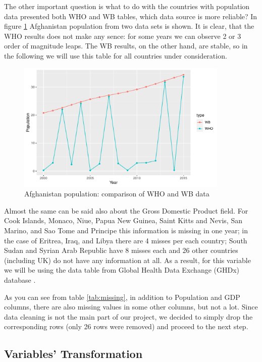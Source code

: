 The other important question is what to do with the countries with population data presented both WHO and WB tables, which data source is more reliable? In figure \ref{fig:afghanistan_pop_comparison} Afghanistan population from two data sets is shown. It is clear, that the WHO results does not make any sence: for some years we can observe 2 or 3 order of magnitude leaps. The WB results, on the other hand, are stable, so in the following we will use this table for all countries under consideration.


\begin{figure}
  \centering
  \includegraphics[width = 0.9\textwidth]{figures/Afghanistan_population_comparison}
  \caption{Afghanistan population: comparison of WHO and WB data}
  \label{fig:afghanistan_pop_comparison}
\end{figure}

Almost the same can be said also about the Gross Domestic Product field. For Cook Islands, Monaco, Niue, Papua New Guinea, Saint Kitts and Nevis, San Marino, and Sao Tome and Principe this information is missing in one year; in the case of Eritrea, Iraq, and Libya there are 4 misses per each country; South Sudan and Syrian Arab Republic have 8 misses each and 26 other countries (including UK) do not have any information at all. As a result, for this variable we will be using the data table from Global Health Data Exchange (GHDx) database \cite{GHDx}.

As you can see from table \ref{tab:missing}, in addition to Population and GDP columns, there are also missing values in some other columns, but not a lot. Since data cleaning is not the main part of our project, we decided to simply drop the corresponding rows (only 26 rows were removed) and proceed to the next step.


\subsection{Variables' Transformation}
\label{sec:vari-transf}






